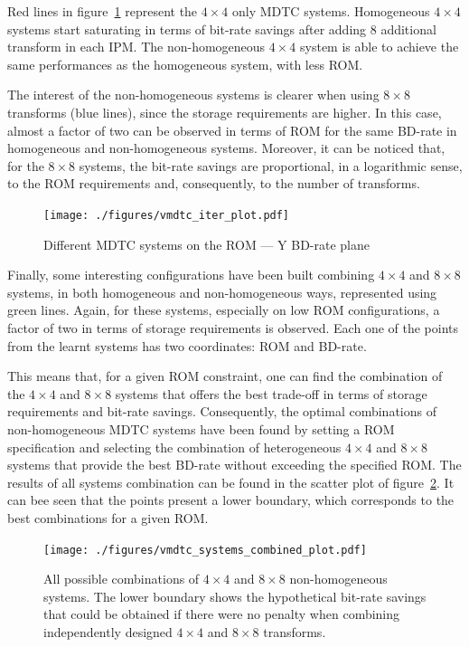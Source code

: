 \documentclass[11pt,a4paper,openright,twoside]{book}
\numberwithin{equation}{section} %
\numberwithin{figure}{section} %
\numberwithin{table}{section} %
\begin{document}
Red lines in figure~\ref{fig:vmdtc_iter} represent the $4\times4$ only
\ac{MDTC} systems.
Homogeneous $4\times4$ systems start saturating in terms of bit-rate savings
after adding 8 additional transform in each \ac{IPM}.
The non-homogeneous $4\times4$ system is able to achieve the same performances
as the homogeneous system, with less \acs{ROM}.

The interest of the non-homogeneous systems is clearer when using $8\times8$
transforms (blue lines), since the storage requirements are higher.
In this case, almost a factor of two can be observed in terms of \acs{ROM} for
the same \ac{BD}-rate in homogeneous and non-homogeneous systems.
Moreover, it can be noticed that, for the $8\times8$ systems, the bit-rate
savings are proportional, in a logarithmic sense, to the \acs{ROM}
requirements and, consequently, to the number of transforms.

\begin{figure}[tb]
	\centering
	\texttt{[image: ./figures/vmdtc\_iter\_plot.pdf]}
	\caption{Different \acs{MDTC} systems on the \acs{ROM} --- Y \acs{BD}-rate
	plane}
	\label{fig:vmdtc_iter}
\end{figure}

Finally, some interesting configurations have been built combining $4\times4$
and $8\times8$ systems, in both homogeneous and non-homogeneous ways,
represented using green lines.
Again, for these systems, especially on low \acs{ROM} configurations, a factor
of two in terms of storage requirements is observed.
Each one of the points from the learnt systems has two coordinates: \acs{ROM}
and \ac{BD}-rate.

This means that, for a given \acs{ROM} constraint, one can find the
combination of the $4\times4$ and $8\times8$ systems that offers the best
trade-off in terms of storage requirements and bit-rate savings.
Consequently, the optimal combinations of non-homogeneous \ac{MDTC} systems
have been found by setting a \acs{ROM} specification and selecting the
combination of heterogeneous $4\times4$ and $8\times8$ systems that provide
the best \ac{BD}-rate without exceeding the specified \acs{ROM}.
The results of all systems combination can be found in the scatter plot of
figure~\ref{fig:vmdtc_combined}.
It can bee seen that the points present a lower boundary, which corresponds to
the best combinations for a given \acs{ROM}.

\begin{figure}[tb]
	\centering
	\texttt{[image: ./figures/vmdtc\_systems\_combined\_plot.pdf]}
	\caption[All possible combinations of $4\times4$ and $8\times8$
	non-homogeneous systems]
	{All possible combinations of $4\times4$ and $8\times8$
	non-homogeneous systems.
	The lower boundary shows the hypothetical bit-rate savings that could be
	obtained if there were no penalty when combining independently designed
	$4\times4$ and $8\times8$ transforms.}
	\label{fig:vmdtc_combined}
\end{figure}
\end{document}
